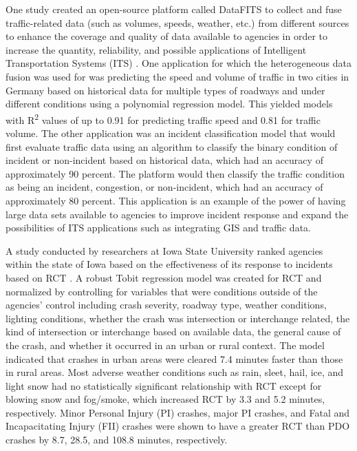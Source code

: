 \documentclass[
  letterpaper,
  authoryear]{elsarticle}
\begin{document}
One study created an open-source platform called DataFITS to collect and
fuse traffic-related data (such as volumes, speeds, weather, etc.) from
different sources to enhance the coverage and quality of data available
to agencies in order to increase the quantity, reliability, and possible
applications of Intelligent Transportation Systems (ITS)
\citep{zisner_datafits_2023}. One application for which the
heterogeneous data fusion was used for was predicting the speed and
volume of traffic in two cities in Germany based on historical data for
multiple types of roadways and under different conditions using a
polynomial regression model. This yielded models with
R\textsuperscript{2} values of up to 0.91 for predicting traffic speed
and 0.81 for traffic volume. The other application was an incident
classification model that would first evaluate traffic data using an
algorithm to classify the binary condition of incident or non-incident
based on historical data, which had an accuracy of approximately 90
percent. The platform would then classify the traffic condition as being
an incident, congestion, or non-incident, which had an accuracy of
approximately 80 percent. This application is an example of the power of
having large data sets available to agencies to improve incident
response and expand the possibilities of ITS applications such as
integrating GIS and traffic data.

A study conducted by researchers at Iowa State University ranked
agencies within the state of Iowa based on the effectiveness of its
response to incidents based on RCT \citep{mumtarin_traffic_2023}. A
robust Tobit regression model was created for RCT and normalized by
controlling for variables that were conditions outside of the agencies'
control including crash severity, roadway type, weather conditions,
lighting conditions, whether the crash was intersection or interchange
related, the kind of intersection or interchange based on available
data, the general cause of the crash, and whether it occurred in an
urban or rural context. The model indicated that crashes in urban areas
were cleared 7.4 minutes faster than those in rural areas. Most adverse
weather conditions such as rain, sleet, hail, ice, and light snow had no
statistically significant relationship with RCT except for blowing snow
and fog/smoke, which increased RCT by 3.3 and 5.2 minutes, respectively.
Minor Personal Injury (PI) crashes, major PI crashes, and Fatal and
Incapacitating Injury (FII) crashes were shown to have a greater RCT
than PDO crashes by 8.7, 28.5, and 108.8 minutes, respectively.
\end{document}
